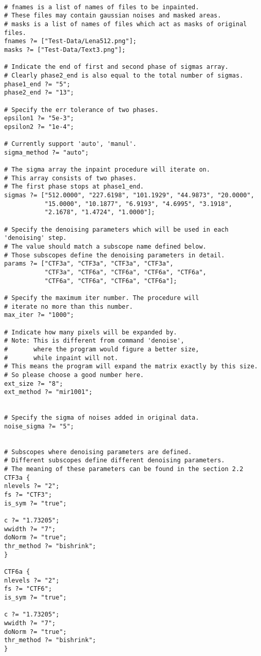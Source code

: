 \documentclass[a4paper,5pt]{article}
\begin{document}
\begin{lstlisting}

# fnames is a list of names of files to be inpainted. 
# These files may contain gaussian noises and masked areas.
# masks is a list of names of files which act as masks of original files.
fnames ?= ["Test-Data/Lena512.png"];
masks ?= ["Test-Data/Text3.png"];

# Indicate the end of first and second phase of sigmas array.
# Clearly phase2_end is also equal to the total number of sigmas.
phase1_end ?= "5";
phase2_end ?= "13";

# Specify the err tolerance of two phases.
epsilon1 ?= "5e-3";
epsilon2 ?= "1e-4";

# Currently support 'auto', 'manul'.
sigma_method ?= "auto";

# The sigma array the inpaint procedure will iterate on. 
# This array consists of two phases.
# The first phase stops at phase1_end.
sigmas ?= ["512.0000", "227.6198", "101.1929", "44.9873", "20.0000", 
           "15.0000", "10.1877", "6.9193", "4.6995", "3.1918", 
           "2.1678", "1.4724", "1.0000"];

# Specify the denoising parameters which will be used in each 'denoising' step.
# The value should match a subscope name defined below. 
# Those subscopes define the denoising parameters in detail.
params ?= ["CTF3a", "CTF3a", "CTF3a", "CTF3a", 
           "CTF3a", "CTF6a", "CTF6a", "CTF6a", "CTF6a", 
           "CTF6a", "CTF6a", "CTF6a", "CTF6a"];

# Specify the maximum iter number. The procedure will
# iterate no more than this number.
max_iter ?= "1000";

# Indicate how many pixels will be expanded by.
# Note: This is different from command 'denoise', 
#       where the program would figure a better size,
#       while inpaint will not.
# This means the program will expand the matrix exactly by this size. 
# So please choose a good number here.
ext_size ?= "8";
ext_method ?= "mir1001";


# Specify the sigma of noises added in original data.
noise_sigma ?= "5";


# Subscopes where denoising parameters are defined.
# Different subscopes define different denoising parameters.
# The meaning of these parameters can be found in the section 2.2
CTF3a {
nlevels ?= "2";
fs ?= "CTF3";
is_sym ?= "true";

c ?= "1.73205";
wwidth ?= "7";
doNorm ?= "true";
thr_method ?= "bishrink";
}

CTF6a {
nlevels ?= "2";
fs ?= "CTF6";
is_sym ?= "true";

c ?= "1.73205";
wwidth ?= "7";
doNorm ?= "true";
thr_method ?= "bishrink";
}

\end{lstlisting}
\end{document}
